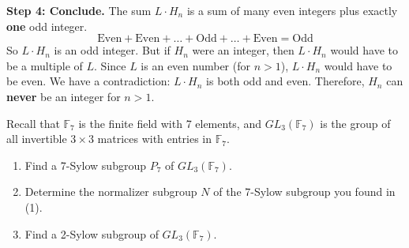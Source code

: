\begin{solution}
\textbf{Step 4: Conclude.}
The sum $L \cdot H_n$ is a sum of many even integers plus exactly \textbf{one} odd integer.
\[ \text{Even} + \text{Even} + \dots + \text{Odd} + \dots + \text{Even} = \text{Odd} \]
So $L \cdot H_n$ is an odd integer.
But if $H_n$ were an integer, then $L \cdot H_n$ would have to be a multiple of $L$.
Since $L$ is an even number (for $n > 1$), $L \cdot H_n$ would have to be even.
We have a contradiction: $L \cdot H_n$ is both odd and even.
Therefore, $H_n$ can \textbf{never} be an integer for $n > 1$.
\end{solution}

\begin{exercise}
\label{algebra:2011:11}
Recall that $\mathbb{F}_7$ is the finite field with 7 elements, and $GL_3(\mathbb{F}_7)$ is the group of all invertible $3 \times 3$ matrices with entries in $\mathbb{F}_7$.
\begin{enumerate}
    \item Find a 7-Sylow subgroup $P_7$ of $GL_3(\mathbb{F}_7)$.
    \item Determine the normalizer subgroup $N$ of the 7-Sylow subgroup you found in (1).
    \item Find a 2-Sylow subgroup of $GL_3(\mathbb{F}_7)$.
\end{enumerate}
\end{exercise}

